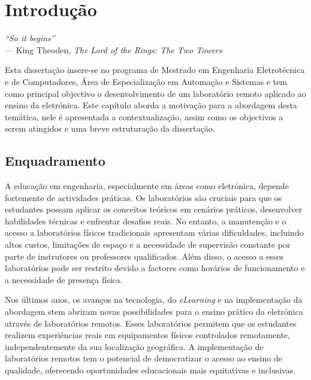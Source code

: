 
\chapter{Introdução} 	%
\label{Capítulo1} 		%

\begin{flushright}
\textit{``So it begins''} \\[0.5em]
--- King Theoden, \textit{The Lord of the Rings: The Two Towers}
\end{flushright}

Esta dissertação insere-se no programa de Mestrado em Engenharia Eletrotécnica e de Computadores, Área de Especialização em Automação e Sistemas e tem como principal objectivo o desenvolvimento de um \acrfull{laboratório remoto} aplicado ao ensino da eletrónica.
Este capítulo aborda a motivação para a abordagem desta temática, nele é apresentada a contextualização, assim como os objectivos a serem atingidos e uma breve estruturação da dissertação.

\section{Enquadramento}
\label{sec: Enquadramento}
A educação em engenharia, especialmente em áreas como eletrónica, depende fortemente de actividades práticas. Os laboratórios são cruciais para que os estudantes possam aplicar os conceitos teóricos em cenários práticos, desenvolver habilidades técnicas e enfrentar desafios reais\cite{Hofstein}\cite{BRINSON2015218}. No entanto, a manutenção e o acesso a laboratórios físicos tradicionais apresentam várias dificuldades, incluindo altos custos, limitações de espaço e a necessidade de supervisão constante por parte de instrutores ou professores qualificados\cite{feisel}. Além disso, o acesso a esses laboratórios pode ser restrito devido a factores como horários de funcionamento e a necessidade de presença física.

Nos últimos anos, os avanços na tecnologia, do \textit{eLearning} e na implementação da abordagem \acrfull{stem} abriram novas possibilidades para o ensino prático da eletrónica através de laboratórios remotos. Esses laboratórios permitem que os estudantes realizem experiências reais em equipamentos físicos controlados remotamente, independentemente da sua localização geográfica. A implementação de laboratórios remotos tem o potencial de democratizar o acesso ao ensino de qualidade, oferecendo oportunidades educacionais mais equitativas e inclusivas\cite{CORTER20112054}.


